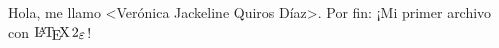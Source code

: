 \documentclass{article}
\begin{document}
Hola, me llamo <Verónica Jackeline Quiros Díaz>. Por fin: ¡Mi primer archivo con $\LaTeXe$!
\end{document}
